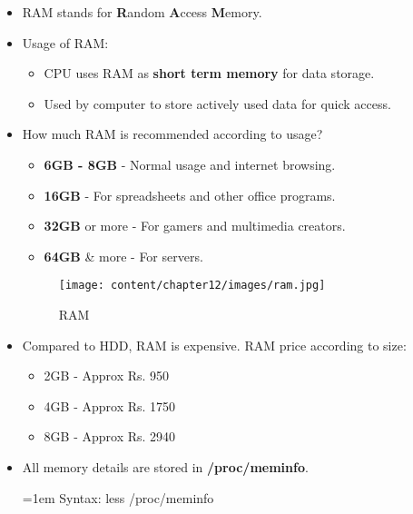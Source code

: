 \setlength{\columnsep}{3pt}
\begin{flushleft}

\begin{itemize}
	\item RAM stands for \textbf{R}andom \textbf{A}ccess \textbf{M}emory.
	\item Usage of RAM:
	\begin{itemize}
		\item CPU uses RAM as \textbf{short term memory} for data storage.
		\item Used by computer to store actively used data for quick access.
	\end{itemize}
	\item How much RAM is recommended according to usage?
	\begin{itemize}
		\item \textbf{6GB - 8GB} - Normal usage and internet browsing.
		\item \textbf{16GB} - For spreadsheets and other office programs.
		\item \textbf{32GB} or more - For gamers and multimedia creators.
		\item \textbf{64GB} \& more - For servers.
	\end{itemize}

	\begin{figure}[h!]
		\centering
		\texttt{[image: content/chapter12/images/ram.jpg]}
		\caption{RAM}
		\label{fig:ram}
	\end{figure}

	\item Compared to HDD, RAM is expensive. RAM price according to size:
	\begin{itemize}
			\item 2GB - Approx Rs. 950
			\item 4GB - Approx Rs. 1750
			\item 8GB - Approx Rs. 2940
	\end{itemize}

	\item All memory details are stored in \textbf{/proc/meminfo}.
	\bigskip
	\begin{tcolorbox}[breakable,notitle,boxrule=-0pt,colback=pink,colframe=pink]
		\color{black}
		\font=1em
		Syntax: less /proc/meminfo
		\font=4pt
	\end{tcolorbox}



\end{itemize}

\end{flushleft}

\newpage



